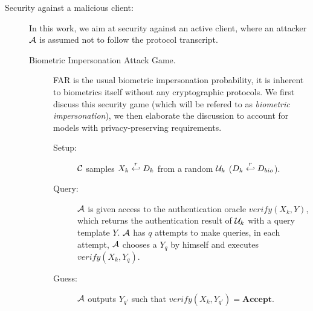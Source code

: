 \begin{description}
\item[Security against a malicious client:] In this work, we aim at security
  against an active client, where an attacker $\mathcal{A}$ is assumed not to
  follow the protocol transcript.
  \begin{description}
  \item[Biometric Impersonation Attack Game.] FAR is the usual biometric
    impersonation probability, it is inherent to biometrics itself without any
    cryptographic protocols. We first discuss this security game (which will be
    refered to as \textit{biometric impersonation}), we then elaborate the
    discussion to account for models with privacy-preserving requirements.
    \begin{description}
    \item[Setup:] $\mathcal{C}$ samples $X_k \stackrel{r}{\hookleftarrow} D_{k}$ from a random
      $\mathcal{U}_k$ ($D_k \stackrel{r}{\hookleftarrow} D_{bio}$).
    \item[Query:] $\mathcal{A}$ is given access to the authentication oracle
      $verify(X_k,Y)$, which returns the authentication result of $\mathcal{U}_k$ with
      a query template $Y$. $\mathcal{A}$ has $q$ attempts to make queries, in
      each attempt, $\mathcal{A}$ chooses a $Y_{q}$ by himself and executes
      $verify(X_k,Y_{q})$.
    \item[Guess:] $\mathcal{A}$ outputs $Y_{q'}$ such that
      $verify(X_k,Y_{q'}) = \textbf{Accept}$.
    \end{description}


\end{description}
\end{description}
